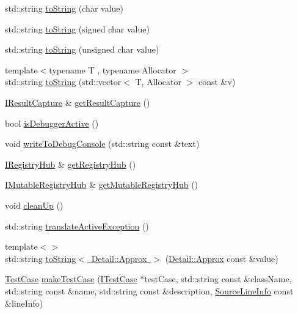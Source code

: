 \begin{DoxyCompactItemize}
\item 
std\+::string \mbox{\hyperlink{namespace_catch_a25a0a78cbb62ea08b5d49e443051c387}{to\+String}} (char value)
\item 
std\+::string \mbox{\hyperlink{namespace_catch_a0a5d9d0965d0d2a0663773732283713e}{to\+String}} (signed char value)
\item 
std\+::string \mbox{\hyperlink{namespace_catch_a5d83eaeb68579a556c86cc05f7a7765f}{to\+String}} (unsigned char value)
\item 
{\footnotesize template$<$typename T , typename Allocator $>$ }\\std\+::string \mbox{\hyperlink{namespace_catch_a2899237fef39daaae9a22e7846c0a9bf}{to\+String}} (std\+::vector$<$ T, Allocator $>$ const \&v)
\item 
\mbox{\hyperlink{struct_catch_1_1_i_result_capture}{I\+Result\+Capture}} \& \mbox{\hyperlink{namespace_catch_aff60c1de6ac6cea30175d70e33d83c8e}{get\+Result\+Capture}} ()
\item 
bool \mbox{\hyperlink{namespace_catch_ab079497368fb1df25af39ad494d2a241}{is\+Debugger\+Active}} ()
\item 
void \mbox{\hyperlink{namespace_catch_aa5dcf4750ce9a854f4b74d3c952d13cc}{write\+To\+Debug\+Console}} (std\+::string const \&text)
\item 
\mbox{\hyperlink{struct_catch_1_1_i_registry_hub}{I\+Registry\+Hub}} \& \mbox{\hyperlink{namespace_catch_ac24b072979540bfd922e7d46e899f46f}{get\+Registry\+Hub}} ()
\item 
\mbox{\hyperlink{struct_catch_1_1_i_mutable_registry_hub}{I\+Mutable\+Registry\+Hub}} \& \mbox{\hyperlink{namespace_catch_ac9ddcc6d66079add9cb2a3140b8ae51e}{get\+Mutable\+Registry\+Hub}} ()
\item 
void \mbox{\hyperlink{namespace_catch_a0f78e9afdebc6d4512d18e76fbf54b8c}{clean\+Up}} ()
\item 
std\+::string \mbox{\hyperlink{namespace_catch_adafff91485eeeeb9e9333f317cc0e3b1}{translate\+Active\+Exception}} ()
\item 
{\footnotesize template$<$$>$ }\\std\+::string \mbox{\hyperlink{namespace_catch_ac501c2b6bfe82978d699ddda37c53d13}{to\+String$<$ Detail\+::\+Approx $>$}} (\mbox{\hyperlink{class_catch_1_1_detail_1_1_approx}{Detail\+::\+Approx}} const \&value)
\item 
\mbox{\hyperlink{class_catch_1_1_test_case}{Test\+Case}} \mbox{\hyperlink{namespace_catch_a2a784590bb5068810d3f6013fed1f1d3}{make\+Test\+Case}} (\mbox{\hyperlink{struct_catch_1_1_i_test_case}{I\+Test\+Case}} $\ast$test\+Case, std\+::string const \&class\+Name, std\+::string const \&name, std\+::string const \&description, \mbox{\hyperlink{struct_catch_1_1_source_line_info}{Source\+Line\+Info}} const \&line\+Info)
\end{DoxyCompactItemize}


